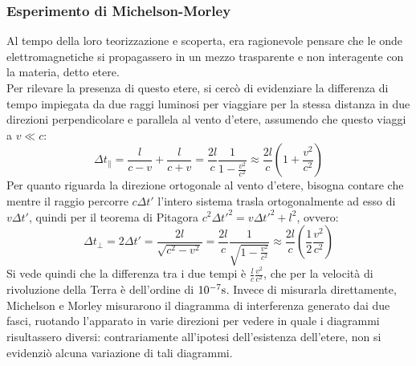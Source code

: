 \documentclass[]{article}
\begin{document}
\subsubsection{Esperimento di Michelson-Morley}

Al tempo della loro teorizzazione e scoperta, era ragionevole pensare che le onde elettromagnetiche si propagassero in un mezzo trasparente e non interagente con la materia, detto etere. \\ 
%
Per rilevare la presenza di questo etere, si cercò di evidenziare la differenza di tempo impiegata da due raggi luminosi per viaggiare per la stessa distanza in due direzioni perpendicolare e parallela al vento d'etere, assumendo che questo viaggi a $ v \ll c $:
\begin{equation}
	\Delta t_{\parallel} = \frac{l}{c-v} + \frac{l}{c+v} = \frac{2l}{c}\frac{1}{1 - \frac{v^2}{c^2}} \approx \frac{2l}{c}\left(1 + \frac{v^2}{c^2}\right)
	\label{eq:2}
\end{equation}
Per quanto riguarda la direzione ortogonale al vento d'etere, bisogna contare che mentre il raggio percorre $ c\Delta t' $ l'intero sistema trasla ortogonalmente ad esso di $ v\Delta t' $, quindi per il teorema di Pitagora $ c^2 \Delta t'^2 = v \Delta t'^2 + l^2 $, ovvero:
\begin{equation}
	\Delta t_{\perp} = 2 \Delta t' = \frac{2l}{\sqrt{c^2 - v^2}} = \frac{2l}{c} \frac{1}{\sqrt{1 - \frac{v^2}{c^2}}} \approx \frac{2l}{c} \left(\frac{1}{2}\frac{v^2}{c^2}\right)
	\label{eq:3}
\end{equation}
Si vede quindi che la differenza tra i due tempi è $ \frac{l}{c}\frac{v^2}{c^2} $, che per la velocità di rivoluzione della Terra è dell'ordine di $ 10^{-7} \text{s} $. Invece di misurarla direttamente, Michelson e Morley misurarono il diagramma di interferenza generato dai due fasci, ruotando l'apparato in varie direzioni per vedere in quale i diagrammi risultassero diversi: contrariamente all'ipotesi dell'esistenza dell'etere, non si evidenziò alcuna variazione di tali diagrammi.


%
%
\end{document}

